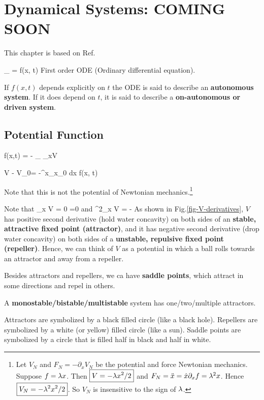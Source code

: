 \chapter{Dynamical Systems: COMING SOON}
\label{ch-dynamical-sys}

This chapter is based on 
Ref.\cite{dynamical-fuchs}

\beq
{}_{}
= f(x, t)
\eeq
First order ODE (Ordinary differential equation).

If $f(x,t)$
depends explicitly on $t$ 
the ODE is said
to describe an {\bf autonomous
system}.
If it does depend on $t$,
it is said to describe a
{\bf on-autonomous or driven
system}.


\section{Potential Function}


\beq
f(x,t) = -
_{ \partial_xV}
\eeq

\beq
V - V_0= -\int^x_{x_0} dx \; f(x, t)
\eeq

Note that this is not the potential of Newtonian mechanics.\footnote{Let $V_N$ and $F_N=-\partial_x V_N$ be the potential and force
Newtonian mechanics. Suppose $f=\lambda x$. Then $\boxed{V=-\lambda x^2/2}$ and
$F_N= \ddot{x} = \dot{x}\partial_x f =
\lambda^2 x$. Hence $\boxed{V_N = -\lambda^2 x^2/2}$.
So $V_N$ is insensitive to the sign of $\lambda$.
}

Note that
\beq
\partial_x V = 0 \iff {}=0
\eeq
and
\beq
\partial^2_x V = -
\eeq
As shown in Fig.\ref{fig-V-derivatives},
$V$ has positive second derivative
(hold water concavity)
on both sides of an {\bf stable, attractive fixed  point (attractor)},
and it has negative second derivative
(drop water concavity)
on both sides of a {\bf unstable, repulsive fixed point (repeller)}. Hence, we can think of
$V$ as a potential in which a ball rolls towards an attractor
and away from a repeller.

Besides attractors and repellers, we ca have
{\bf saddle points},
which attract in some directions and repel in others. 

A {\bf monostable/bistable/multistable}
system has one/two/multiple
attractors.

Attractors are symbolized by a black filled circle (like a black hole). Repellers are 
symbolized by a white (or yellow)  filled circle (like a sun).
Saddle points are 
symbolized by a circle that
is filled half in black
and half in white.


